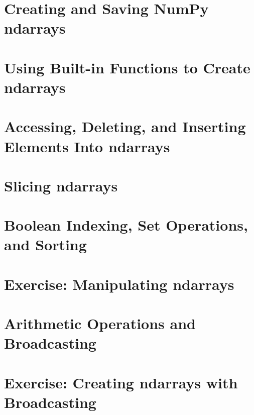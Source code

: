 \documentclass{article}
\begin{document}
\section{Creating and Saving NumPy ndarrays}\label{sec:concept1}


\section{Using Built-in Functions to Create ndarrays}\label{sec:concept2}

\section{Accessing, Deleting, and Inserting Elements Into ndarrays}\label{sec:concept3}

\section{Slicing ndarrays}\label{sec:concept4}

\section{Boolean Indexing, Set Operations, and Sorting}\label{sec:concept5}

\section{Exercise: Manipulating ndarrays}\label{sec:exercise1}

\section{Arithmetic Operations and Broadcasting}\label{sec:concept6}

\section{Exercise: Creating ndarrays with Broadcasting}\label{sec:exercise2}
\end{document}
